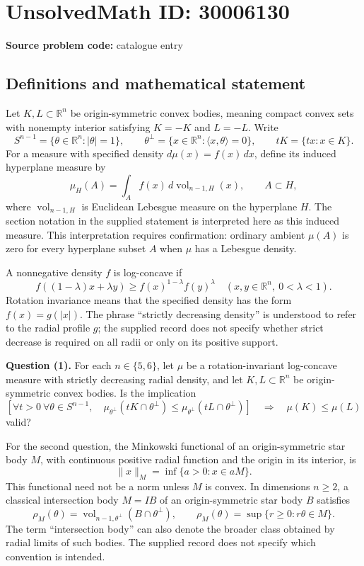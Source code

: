 \documentclass[11pt]{article}
\newcommand{\R}{\mathbb{R}}
\begin{document}
\section*{UnsolvedMath ID: 30006130}
\textbf{Source problem code:} catalogue entry
\subsection{Definitions and mathematical statement}
Let \(K,L\subset\R^n\) be origin-symmetric convex bodies, meaning compact convex sets with nonempty interior satisfying \(K=-K\) and \(L=-L\). Write
\[
S^{n-1}=\{\theta\in\R^n:|\theta|=1\},\qquad
\theta^\perp=\{x\in\R^n:\langle x,\theta\rangle=0\},\qquad
tK=\{tx:x\in K\}.
\]
For a measure with specified density \(d\mu(x)=f(x)\,dx\), define its induced hyperplane measure by
\[
\mu_H(A)=\int_A f(x)\,d\operatorname{vol}_{n-1,H}(x),\qquad A\subset H,
\]
where \(\operatorname{vol}_{n-1,H}\) is Euclidean Lebesgue measure on the hyperplane \(H\). The section notation in the supplied statement is interpreted here as this induced measure. This interpretation requires confirmation: ordinary ambient \(\mu(A)\) is zero for every hyperplane subset \(A\) when \(\mu\) has a Lebesgue density.

A nonnegative density \(f\) is log-concave if
\[
f((1-\lambda)x+\lambda y)\geq f(x)^{1-\lambda}f(y)^\lambda
\quad(x,y\in\R^n,\ 0<\lambda<1).
\]
Rotation invariance means that the specified density has the form \(f(x)=g(|x|)\). The phrase ``strictly decreasing density'' is understood to refer to the radial profile \(g\); the supplied record does not specify whether strict decrease is required on all radii or only on its positive support.

\textbf{Question (1).} For each \(n\in\{5,6\}\), let \(\mu\) be a rotation-invariant log-concave measure with strictly decreasing radial density, and let \(K,L\subset\R^n\) be origin-symmetric convex bodies. Is the implication
\[
\left[
\forall t>0\ \forall\theta\in S^{n-1},\quad
\mu_{\theta^\perp}(tK\cap\theta^\perp)
\leq
\mu_{\theta^\perp}(tL\cap\theta^\perp)
\right]
\quad\Longrightarrow\quad
\mu(K)\leq\mu(L)
\]
valid?

For the second question, the Minkowski functional of an origin-symmetric star body \(M\), with continuous positive radial function and the origin in its interior, is
\[
\|x\|_M=\inf\{a>0:x\in aM\}.
\]
This functional need not be a norm unless \(M\) is convex. In dimensions \(n\geq2\), a classical intersection body \(M=IB\) of an origin-symmetric star body \(B\) satisfies
\[
\rho_M(\theta)=\operatorname{vol}_{n-1,\theta^\perp}(B\cap\theta^\perp),
\qquad
\rho_M(\theta)=\sup\{r\geq0:r\theta\in M\}.
\]
The term ``intersection body'' can also denote the broader class obtained by radial limits of such bodies. The supplied record does not specify which convention is intended.
\end{document}
